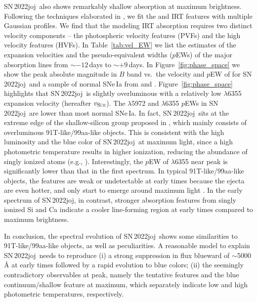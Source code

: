 \documentclass[twocolumn]{aastex631}
\newcommand{\sn}{SN\,2022joj}
\begin{document}
\begin{CJK*}{UTF8}{gbsn}
\sn\ also shows remarkably shallow  absorption at maximum brightness. Following the techniques elaborated in \citet{Liu_20jgb_2023} \citep[see also][]{Childress_2013,Childress_2014,Maguire_2014}, we fit the  and  IRT features with multiple Gaussian profiles. We find that the modeling  IRT absorption requires two distinct velocity components -- the photospheric velocity features (PVFs) and the high velocity features (HVFs). In Table~\ref{tab:vel_EW} we list the estimates of the expansion velocities and the pseudo-equivalent widths ($p$EWs) of the major absorption lines from $\sim$$-12$\,days to $\sim$$+9$\,days. In Figure~\ref{fig:phase_space} we show the peak absolute magnitude in $B$ band vs.\ the velocity and $p$EW of  for \sn\ and a sample of normal SNe\,Ia from \citet{Zheng_2018} and \citet{Burrow_2020}. Figure~\ref{fig:phase_space} highlights that \sn\ is slightly overluminous with a relatively low  $\lambda$6355 expansion velocity (hereafter $v_\mathrm{Si\,\textsc{ii}}$). The  $\lambda$5972 and  $\lambda$6355 $p$EWs in \sn\ are lower than most normal SNe\,Ia. In fact, \sn\ sits at the extreme edge of the shallow-silicon group proposed in \citet{Branch_2006}, which mainly consists of overluminous 91T-like/99aa-like objects. This is consistent with the high luminosity and the blue color of \sn\ at maximum light, since a high photometric temperature results in higher ionization, reducing the abundance of singly ionized atoms (e.g., ). Interestingly, the $p$EW of  $\lambda$6355 near peak is significantly lower than that in the first spectrum. In typical 91T-like/99aa-like objects, the  features are weak or undetectable at early times because the ejecta are even hotter, and only start to emerge around maximum light \citep{Filippenko_91T_1992}. In the early spectrum of \sn, in contrast, stronger absorption features from singly ionized Si and Ca indicate a cooler line-forming region at early times compared to maximum brightness.

In conclusion, the spectral evolution of \sn\ shows some similarities to 91T-like/99aa-like objects, as well as peculiarities. A reasonable model to explain \sn\ needs to reproduce (i) a strong suppression in flux blueward of $\sim$5000\,\r{A} at early times followed by a rapid evolution to blue colors; (ii) the seemingly contradictory observables at peak, namely the tentative  features and the blue continuum/shallow  feature at maximum, which separately indicate low and high photometric temperatures, respectively.


\end{CJK*}
\end{document}
